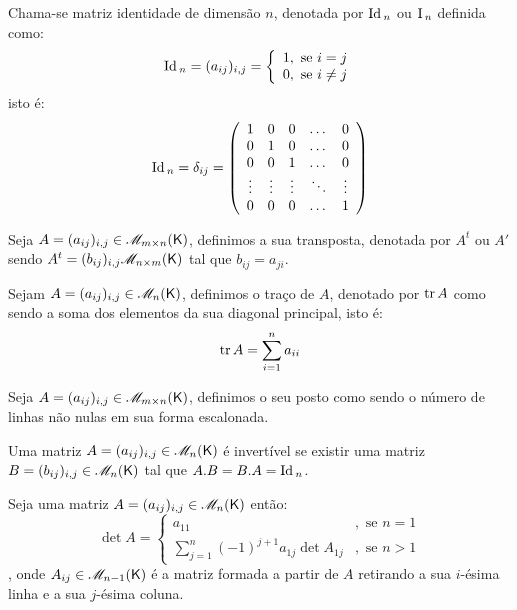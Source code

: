 \documentclass[10pt,a4paper]{book}
\begin{document}
\begin{definition}
	Chama-se matriz identidade de dimensão $n$, denotada por $\mathrm{ Id }\,_n$ ou $\mathrm{ I }\,_n$ definida como:
	\[
		\mathrm{ Id }\,_n = (a_{ij})_{i,j} = \left\{\begin{array}{ll}
		1, \text{ se } i = j\\
		0, \text{ se } i \neq j 
		\end{array}\right.
	\]
	isto é:
	\[
		\mathrm{ Id }\,_n = \delta_{ij} = 
		\left(\begin{array}{ccccc}
			     1 &      0 &      0 &  \dots &      0 \\
			     0 &      1 &      0 &  \dots &      0 \\
			     0 &      0 &      1 &  \dots &      0 \\
			\vdots & \vdots & \vdots & \ddots & \vdots \\
			     0 &      0 &      0 &  \dots &      1
		\end{array}\right)
	\]
\end{definition}

\begin{definition}
	Seja $A = (a_{ij})_{i,j} \in \mathscr{ M }_{m \times n}(\mathsf{ K })$, definimos a sua transposta, denotada por $A^t$ ou $A'$ sendo $A^t = (b_{ij})_{i,j} \mathscr{ M }_{n \times m}(\mathsf{ K })$ tal que $b_{ij} = a_{ji}$.
\end{definition}

\begin{definition}
	Sejam $A = (a_{ij})_{i,j} \in \mathscr{ M }_{n}(\mathsf{ K })$, definimos o traço de $A$, denotado por $\mathrm{ tr }\, A$ como sendo a soma dos elementos da sua diagonal principal, isto é: 
	\[
		\mathrm{ tr }\, A = \sum_{i = 1}^{n} a_{ii}
	\]
\end{definition}

\begin{definition}[Posto]
	Seja $A = (a_{ij})_{i,j} \in \mathscr{ M }_{m \times n}(\mathsf{ K })$, definimos o seu posto como sendo o número de linhas não nulas em sua forma escalonada.
\end{definition}

\begin{definition}
	Uma matriz $A = (a_{ij})_{i,j} \in \mathscr{ M }_{n}(\mathsf{ K })$ é invertível se existir uma matriz $B = (b_{ij})_{i,j} \in \mathscr{ M }_{n}(\mathsf{ K })$ tal que $A.B = B.A = \mathrm{ Id }\,_n$.
\end{definition}

\begin{theorem}
	Seja uma matriz $A = (a_{ij})_{i,j} \in \mathscr{ M }_{n}(\mathsf{ K })$ então:
	\[
		\det A =
		\left\{\begin{array}{ll}
     a_{11}                                                         &, \text{ se } n = 1\\
     \displaystyle \sum_{j = 1}^{n} (-1)^{j + 1} a_{1j} \det A_{1j} &, \text{ se } n > 1
		\end{array}\right.
	\], onde $A_{ij} \in \mathscr{ M }_{n - 1}(\mathsf{ K })$ é a matriz formada a partir de $A$ retirando a sua $i$-ésima linha e a sua $j$-ésima coluna.
\end{theorem}
\end{document}
